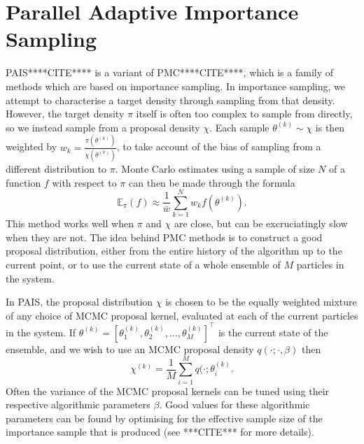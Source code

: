 \documentclass[final]{siamltex}
\begin{document}
\section{Parallel Adaptive Importance Sampling}\label{sec:PAIS}
PAIS****CITE**** is a variant of PMC****CITE****, which is a family of methods which are based
on importance sampling. In importance sampling, we attempt to
characterise a target density through sampling from that
density. However, the target density $\pi$ itself is often too complex to sample
from directly, so we instead sample from a
proposal density $\chi$. Each sample $\theta^{(k)} \sim \chi$ is then weighted by
$w_k = \frac{\pi(\theta^{(k)})}{\chi(\theta^{(k)})}$, to take account of the bias of
sampling from a different distribution to $\pi$. Monte Carlo estimates
using a sample of size $N$
of a function $f$ with respect to $\pi$ can then be made through the
formula
\[\mathbb{E}_\pi(f) \approx \frac{1}{\bar{w}} \sum_{k=1}^N
  w_kf(\theta^(k)).\]
This method works well when $\pi$ and $\chi$ are close, but can be
excruciatingly slow when they are not. The idea behind PMC methods is
to construct a good proposal distribution, either from the entire
history of the algorithm up to the current point, or to use the
current state of a whole ensemble of $M$ particles in the system.

In PAIS, the proposal distribution $\chi$ is chosen to be the equally
weighted mixture of any choice of MCMC proposal kernel, evaluated at
each of the current particles in the system. If $\theta^{(k)} = [\theta_1^{(k)},
\theta_2^{(k)}, \ldots, \theta_M^{(k)}]^\top$ is the current state of the
ensemble, and we wish to use an MCMC proposal density $q(\cdot ;
\cdot, \beta)$ then 
\[\chi^{(k)} = \frac{1}{M} \sum_{i=1}^M q(\cdot ; \theta_i^{(k)}.\]
Often the variance of the MCMC proposal kernels can be tuned using
their respective algorithmic parameters $\beta$. Good values for these
algorithmic parameters can be
found by optimising for the effective sample size of the importance
sample that is produced (see ***CITE*** for more details).
\end{document}
